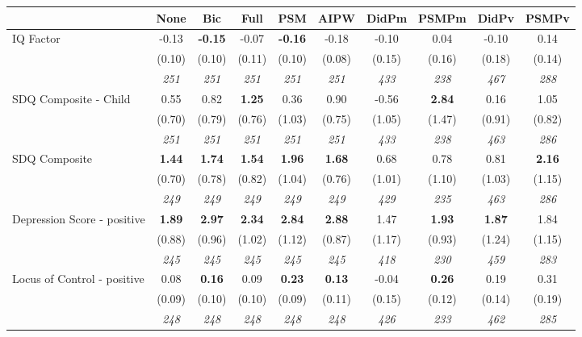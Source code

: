 \begin{tabular}{l c c c c c c c c c}
\toprule
 & None & Bic & Full & PSM & AIPW & DidPm & PSMPm & DidPv & PSMPv \\
\midrule
IQ Factor & -0.13 & \textbf{ -0.15 } & -0.07 & \textbf{-0.16} & -0.18 & -0.10 & 0.04 & -0.10 & 0.14 \\
& (0.10) & (0.10) & (0.11) & (0.10) & (0.08) & (0.15) & (0.16) & (0.18) & (0.14) \\
& \textit{ 251 } & \textit{ 251 } & \textit{ 251 } & \textit{ 251 } & \textit{ 251 } & \textit{ 433 } & \textit{ 238 } & \textit{ 467 } & \textit{ 288 } \\
SDQ Composite - Child & 0.55 & 0.82 & \textbf{ 1.25 } & 0.36 & 0.90 & -0.56 & \textbf{2.84} & 0.16 & 1.05 \\
& (0.70) & (0.79) & (0.76) & (1.03) & (0.75) & (1.05) & (1.47) & (0.91) & (0.82) \\
& \textit{ 251 } & \textit{ 251 } & \textit{ 251 } & \textit{ 251 } & \textit{ 251 } & \textit{ 433 } & \textit{ 238 } & \textit{ 463 } & \textit{ 286 } \\
SDQ Composite & \textbf{ 1.44 } & \textbf{ 1.74 } & \textbf{ 1.54 } & \textbf{1.96} & \textbf{1.68} & 0.68 & 0.78 & 0.81 & \textbf{2.16} \\
& (0.70) & (0.78) & (0.82) & (1.04) & (0.76) & (1.01) & (1.10) & (1.03) & (1.15) \\
& \textit{ 249 } & \textit{ 249 } & \textit{ 249 } & \textit{ 249 } & \textit{ 249 } & \textit{ 429 } & \textit{ 235 } & \textit{ 463 } & \textit{ 286 } \\
Depression Score - positive & \textbf{ 1.89 } & \textbf{ 2.97 } & \textbf{ 2.34 } & \textbf{2.84} & \textbf{2.88} & 1.47 & \textbf{1.93} & \textbf{ 1.87 } & 1.84 \\
& (0.88) & (0.96) & (1.02) & (1.12) & (0.87) & (1.17) & (0.93) & (1.24) & (1.15) \\
& \textit{ 245 } & \textit{ 245 } & \textit{ 245 } & \textit{ 245 } & \textit{ 245 } & \textit{ 418 } & \textit{ 230 } & \textit{ 459 } & \textit{ 283 } \\
Locus of Control - positive & 0.08 & \textbf{ 0.16 } & 0.09 & \textbf{0.23} & \textbf{0.13} & -0.04 & \textbf{0.26} & 0.19 & 0.31 \\
& (0.09) & (0.10) & (0.10) & (0.09) & (0.11) & (0.15) & (0.12) & (0.14) & (0.19) \\
& \textit{ 248 } & \textit{ 248 } & \textit{ 248 } & \textit{ 248 } & \textit{ 248 } & \textit{ 426 } & \textit{ 233 } & \textit{ 462 } & \textit{ 285 } \\

\end{tabular}
